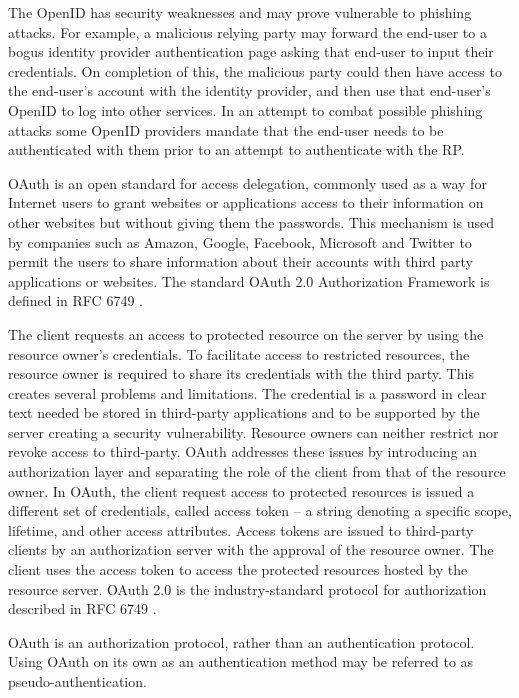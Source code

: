 \begin{multicols}{2}
The OpenID has security weaknesses and may prove vulnerable to phishing attacks. For example, a malicious relying party may forward the end-user to a bogus identity provider authentication page asking that end-user to input their credentials. On completion of this, the malicious party could then have access to the end-user's account with the identity provider, and then use that end-user's OpenID to log into other services. In an attempt to combat possible phishing attacks some OpenID providers mandate that the end-user needs to be authenticated with them prior to an attempt to authenticate with the RP.

OAuth is an open standard for access delegation, commonly used as a way for Internet users to grant websites or applications access to their information on other websites but without giving them the passwords. This mechanism is used by companies such as Amazon, Google, Facebook, Microsoft and Twitter to permit the users to share information about their accounts with third party applications or websites. The standard OAuth 2.0 Authorization Framework is defined in RFC 6749 \cite{chap2-key26}.

The client requests an access to protected resource on the server by using the resource owner's credentials. To facilitate access to restricted resources, the resource owner is required to share its credentials with the third party. This creates several problems and limitations. The credential is a password in clear text needed be stored in third-party applications and to be supported by the server creating a security vulnerability. Resource owners can neither restrict nor revoke access to third-party. OAuth addresses these issues by introducing an authorization layer and separating the role of the client from that of the resource owner. In OAuth, the client request access to protected resources is issued a different set of credentials, called access token -- a string denoting a specific scope, lifetime, and other access attributes. Access tokens are issued to third-party clients by an authorization server with the  approval of the resource owner. The client uses the access token to access the protected resources hosted by the resource server. OAuth 2.0 is the industry-standard protocol for authorization described in RFC 6749 \cite{chap2-key21}.

OAuth is an authorization protocol, rather than an authentication protocol. Using OAuth on its own as an authentication method may be referred to as pseudo-authentication. 


\end{multicols}
